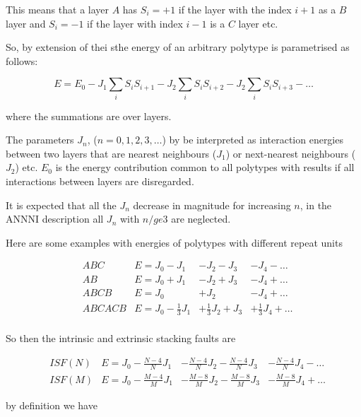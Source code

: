 \documentclass[11pt]{article}
\begin{document}
\begin{enumerate}
\begin{enumerate}
This means that a layer \(A\) has \(S_i = +1\) if the layer with the index \(i+1\)
as a \(B\) layer and \(S_i = -1\) if the layer with index \(i-1\) is a \(C\) layer
etc. 

So, by extension of thei sthe energy of an arbitrary polytype is parametrised
as follows:

\begin{LaTeX}
\[
E = E_{0} - J_{1} \sum_{i} S_{i} S_{i+1} - J_{2}\sum_{i} S_{i}S_{i+2} - J_{2}\sum_{i} S_{i}S_{i+3} - \ldots
\]
\end{LaTeX}

where the summations are over layers. 

The parameters \(J_n\), (\(n=0,1,2,3,\ldots\)) by be interpreted as interaction
energies between two layers that are nearest neighbours (\(J_1\)) or
next-nearest neighbours (\(J_2\)) etc. \(E_0\) is the energy contribution common
to all polytypes with results if all interactions between layers are
disregarded.

It is expected that all the \(J_n\) decrease in magnitude for increasing \(n\), in
the ANNNI description all \(J_n\) with \(n /ge 3\) are neglected. 

Here are some examples with energies of polytypes with different repeat units

\begin{LaTeX}
\begin{align}
&ABC     &E = J_0 - J_1 &- J_2 - J_3 &- J_4 - \ldots \\
&AB      &E = J_0 + J_1 &- J_2 + J_3 &- J_4 + \ldots \\
&ABCB    &E = J_0       &+ J_2       &- J_4 + \ldots \\
&ABCACB  &E = J_0 - \frac{1}{3}J_1 &+ \frac{1}{3}J_2 + J_3 &+ \frac{1}{3}J_4 + \ldots \\
\end{align}
\end{LaTeX}

So then the intrinsic and extrinsic stacking faults are
\begin{LaTeX}
\begin{align}
&ISF(N)     &E = J_0 - \frac{N-4}{N}J_1 &- \frac{N-4}{N}J_2 - \frac{N-4}{N}J_3 &- \frac{N-4}{N}J_4 - \ldots \\
&ISF(M)     &E = J_0 - \frac{M-4}{M}J_1 &- \frac{M-8}{M}J_2 - \frac{M-8}{M}J_3 &- \frac{M-8}{M}J_4 + \ldots 
\end{align}
\end{LaTeX}

by definition we have 


\end{enumerate}
\end{enumerate}
\end{document}
